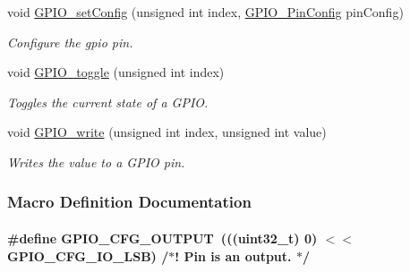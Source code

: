 \begin{DoxyCompactItemize}
void \hyperlink{_g_p_i_o_8h_ae13b9ae70c5d2993d1ac932a91c1f1fa}{G\+P\+I\+O\+\_\+set\+Config} (unsigned int index, \hyperlink{_g_p_i_o_8h_a7f5d979226db633309b3fdc0f4a8aef6}{G\+P\+I\+O\+\_\+\+Pin\+Config} pin\+Config)
\begin{DoxyCompactList}\small\item\em Configure the gpio pin. \end{DoxyCompactList}\item 
void \hyperlink{_g_p_i_o_8h_a5653fbc35078d9140ede8afef074d878}{G\+P\+I\+O\+\_\+toggle} (unsigned int index)
\begin{DoxyCompactList}\small\item\em Toggles the current state of a G\+P\+I\+O. \end{DoxyCompactList}\item 
void \hyperlink{_g_p_i_o_8h_a9ff149a7866241bb29547ead2d327b70}{G\+P\+I\+O\+\_\+write} (unsigned int index, unsigned int value)
\begin{DoxyCompactList}\small\item\em Writes the value to a G\+P\+I\+O pin. \end{DoxyCompactList}\end{DoxyCompactItemize}


\subsubsection{Macro Definition Documentation}
\paragraph[{G\+P\+I\+O\+\_\+\+C\+F\+G\+\_\+\+O\+U\+T\+P\+U\+T}]{\setlength{\rightskip}{0pt plus 5cm}\#define G\+P\+I\+O\+\_\+\+C\+F\+G\+\_\+\+O\+U\+T\+P\+U\+T~(((uint32\+\_\+t) 0) $<$$<$ G\+P\+I\+O\+\_\+\+C\+F\+G\+\_\+\+I\+O\+\_\+\+L\+S\+B) /$\ast$! Pin is an output. $\ast$/}\label{_g_p_i_o_8h_aad0c4b9c093f1d57fd03061b7456193a}
